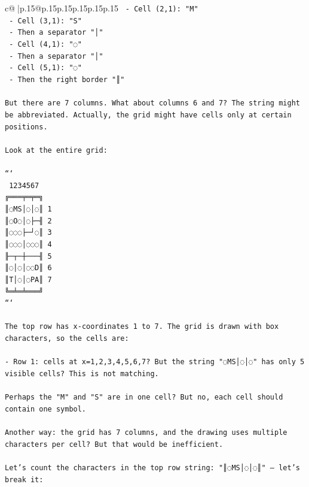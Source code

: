 \documentclass{article}
\begin{document}
{\begin{supertabular}{c@{$\;$}|p{.15\linewidth}@{}p{.15\linewidth}p{.15\linewidth}p{.15\linewidth}p{.15\linewidth}p{.15\linewidth}}
{{{\texttt{    {-} Cell (2,1): "M"} \\
\texttt{    {-} Cell (3,1): "S"} \\
\texttt{    {-} Then a separator "│"} \\
\texttt{    {-} Cell (4,1): "◌"} \\
\texttt{    {-} Then a separator "│"} \\
\texttt{    {-} Cell (5,1): "◌"} \\
\texttt{    {-} Then the right border "║"} \\
\\ 
\texttt{But there are 7 columns. What about columns 6 and 7? The string might be abbreviated. Actually, the grid might have cells only at certain positions.} \\
\\ 
\texttt{Look at the entire grid:} \\
\\ 
\texttt{```} \\
\texttt{ 1234567} \\
\texttt{╔═══╤═╤═╗} \\
\texttt{║◌MS│◌│◌║ 1} \\
\texttt{║◌O◌│◌├─╢ 2} \\
\texttt{║◌◌◌├─┘◌║ 3} \\
\texttt{║◌◌◌│◌◌◌║ 4} \\
\texttt{╟─┬─┼───╢ 5} \\
\texttt{║◌│◌│◌◌D║ 6} \\
\texttt{║T│◌│◌PA║ 7} \\
\texttt{╚═╧═╧═══╝} \\
\texttt{```} \\
\\ 
\texttt{The top row has x{-}coordinates 1 to 7. The grid is drawn with box characters, so the cells are:} \\
\\ 
\texttt{{-} Row 1: cells at x=1,2,3,4,5,6,7? But the string "◌MS│◌│◌" has only 5 visible cells? This is not matching.} \\
\\ 
\texttt{Perhaps the "M" and "S" are in one cell? But no, each cell should contain one symbol.} \\
\\ 
\texttt{Another way: the grid has 7 columns, and the drawing uses multiple characters per cell? But that would be inefficient.} \\
\\ 
\texttt{Let's count the characters in the top row string: "║◌MS│◌│◌║" — let's break it:} \\
}}}
\end{supertabular}}
\end{document}
